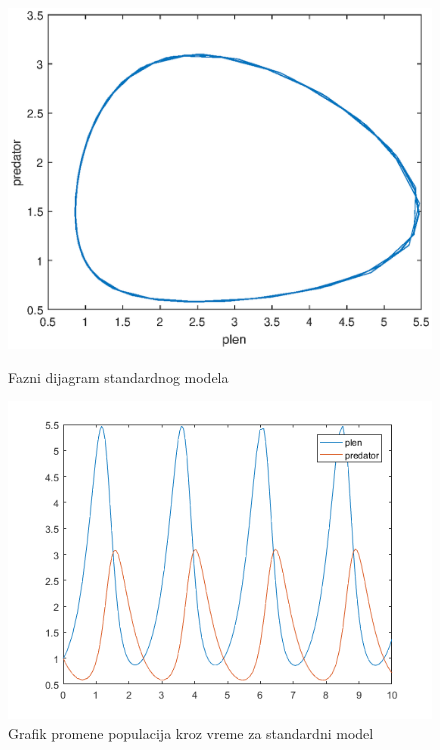 \documentclass[a4paper]{article}
\begin{document}


\begin{figure}[H]
    \centering
    \begin{minipage}{0.45\textwidth}
        \centering
        \includegraphics[width=1\textwidth]{images/lotka_voltera_phase} %
        \caption{Fazni dijagram standardnog modela}
    \end{minipage}\hfill
    \begin{minipage}{0.45\textwidth}
        \centering
        \includegraphics[width=1\textwidth]{images/lotka_voltera_time_plot} %
        \caption{Grafik promene populacija kroz vreme za standardni model}
    \end{minipage}
\end{figure}
\end{document}
